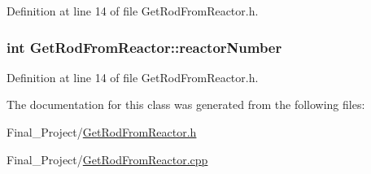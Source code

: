 Definition at line 14 of file Get\-Rod\-From\-Reactor.\-h.

\hypertarget{classGetRodFromReactor_ad2c4d389db38e728e540206aed467670}{
\subsubsection[{reactor\-Number}]{\setlength{\rightskip}{0pt plus 5cm}int Get\-Rod\-From\-Reactor\-::reactor\-Number\hspace{0.3cm}{\ttfamily [private]}}}\label{classGetRodFromReactor_ad2c4d389db38e728e540206aed467670}


Definition at line 14 of file Get\-Rod\-From\-Reactor.\-h.



The documentation for this class was generated from the following files\-:\begin{DoxyCompactItemize}
\item 
Final\-\_\-\-Project/\hyperlink{GetRodFromReactor_8h}{Get\-Rod\-From\-Reactor.\-h}\item 
Final\-\_\-\-Project/\hyperlink{GetRodFromReactor_8cpp}{Get\-Rod\-From\-Reactor.\-cpp}\end{DoxyCompactItemize}
